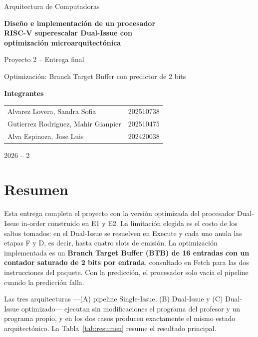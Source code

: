\documentclass[11pt,a4paper]{article}
\begin{document}
\begin{titlepage}
\centering
\vspace*{1.2cm}
{\Large Arquitectura de Computadoras\par}
\vspace{3cm}
{\huge\bfseries Diseño e implementación de un procesador\\[4pt] RISC-V superescalar Dual-Issue con\\[4pt] optimización microarquitectónica\par}
\vspace{2cm}
{\Large Proyecto 2 – Entrega final\par}
\vspace{0.6cm}
{\large Optimización: Branch Target Buffer con predictor de 2 bits\par}
\vspace{3cm}
{\large\bfseries Integrantes\par}
\vspace{0.4cm}
\begin{tabular}{ll}
Alvarez Lovera, Sandra Sofia & 202510738 \\
Gutierrez Rodriguez, Mahir Gianpier & 202510475 \\
Alva Espinoza, Jose Luis & 202420038 \\
\end{tabular}
\vfill
{\large 2026 – 2\par}
\end{titlepage}

\tableofcontents
\newpage

\section*{Resumen}

Esta entrega completa el proyecto con la versión optimizada del procesador Dual-Issue in-order construido en E1 y E2. La limitación elegida es el costo de los saltos tomados: en el Dual-Issue se resuelven en Execute y cada uno anula las etapas F y D, es decir, hasta cuatro slots de emisión. La optimización implementada es un \textbf{Branch Target Buffer (BTB) de 16 entradas con un contador saturado de 2 bits por entrada}, consultado en Fetch para las dos instrucciones del paquete. Con la predicción, el procesador solo vacía el pipeline cuando la predicción falla.

Las tres arquitecturas —(A) pipeline Single-Issue, (B) Dual-Issue y (C) Dual-Issue optimizado— ejecutan sin modificaciones el programa del profesor y un programa propio, y en los dos casos producen exactamente el mismo estado arquitectónico. La Tabla~\ref{tab:resumen} resume el resultado principal.
\end{document}
